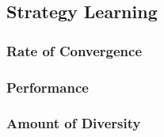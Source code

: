 \subsection{Strategy Learning}
\subsubsection{Rate of Convergence}
\FigNeurovTracker
\subsubsection{Performance}
\subsubsection{Amount of Diversity}
